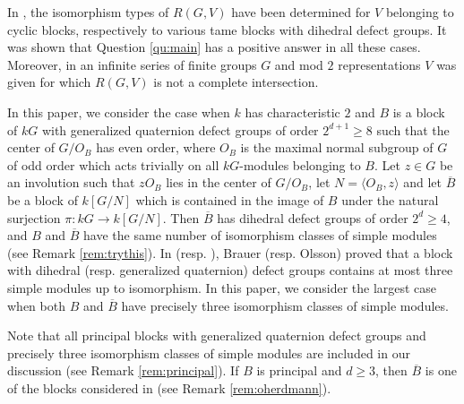 \documentclass{amsart}
\theoremstyle{plain}
\theoremstyle{definition}
\theoremstyle{remark}
\begin{document}
In \cite{bl,diloc,3sim,bc,bllo}, the isomorphism types of $R(G,V)$ have been determined for $V$ 
belonging to cyclic blocks, respectively to various tame blocks with dihedral defect groups. 
It was shown that Question \ref{qu:main} has a positive answer in all these cases.
Moreover, in \cite[Cor. 5.1.2]{3sim} an infinite series of  finite  groups $G$ and mod $2$ 
representations $V$  was given for which $R(G,V)$ is not a complete intersection.

In this paper, we consider the case when $k$ has characteristic $2$ and 
$B$ is a block of $kG$ with generalized quaternion defect groups of order $2^{d+1}\ge 8$
such that the center of $G/O_B$ has even order, where $O_B$ is the maximal
normal subgroup of $G$ of odd order which acts trivially on all $kG$-modules belonging to $B$.
Let $z\in G$ be an involution such that $zO_B$ lies in the center of $G/O_B$, let $N=\langle O_B,z\rangle$
and let $\overline{B}$ be a block of $k[G/N]$ which is contained in the image of $B$ under the 
natural surjection $\pi:kG\to k[G/N]$. 
Then $\overline{B}$ has dihedral defect groups of order $2^d\ge 4$, and 
$B$ and $\overline{B}$ have the same number of isomorphism classes of simple modules
(see Remark \ref{rem:trythis}). 
In \cite{brauer2} (resp. \cite{olsson}), Brauer (resp. Olsson) proved that a block with 
dihedral (resp. generalized quaternion) defect groups contains at most three simple modules up to 
isomorphism. In this paper, we consider the largest case when both $B$ and $\overline{B}$ have
precisely three isomorphism classes of simple modules. 

Note that all principal blocks
with generalized quaternion defect groups and precisely three isomorphism classes of
simple modules are included in our discussion (see Remark \ref{rem:principal}).
If $B$ is principal and $d\ge 3$, then $\overline{B}$ is one of the blocks considered in \cite{3sim} 
(see Remark \ref{rem:oherdmann}).
\end{document}
